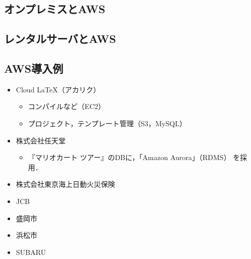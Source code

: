 \subsection{オンプレミスとAWS}
\begin{frame}[t]{\ftitle}

\end{frame}
\subsection{レンタルサーバとAWS}
\begin{frame}[t]{\ftitle}

\end{frame}
\subsection{AWS導入例}
\begin{frame}[t]{\ftitle}
    \begin{itemize}
        \item Cloud LaTeX（アカリク）
              \begin{itemize}
                  \item コンパイルなど（EC2）
                  \item プロジェクト，テンプレート管理（S3，MySQL）
              \end{itemize}
        \item 株式会社任天堂
              \begin{itemize}
                  \item 『マリオカート ツアー』のDBに，「Amazon Aurora」（RDMS） を採用．
              \end{itemize}
        \item 株式会社東京海上日動火災保険
        \item JCB
        \item 盛岡市
        \item 浜松市
        \item SUBARU
    \end{itemize}
\end{frame}